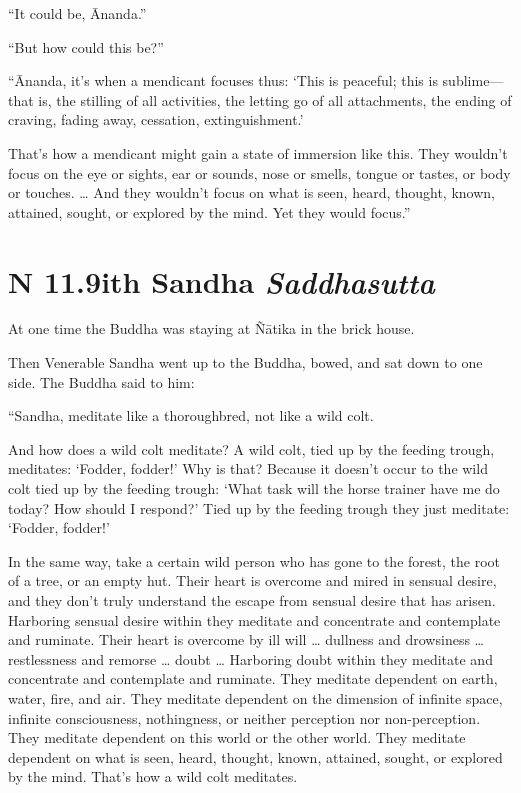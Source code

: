 \documentclass[12pt,openany]{book}%
\newcommand*{\suttatitleacronym}[1]{\smaller[2]{#1}\vspace*{.3em}}
\newcommand*{\suttatitletranslation}[1]{\linebreak{#1}}
\newcommand*{\suttatitleroot}[1]{\linebreak\smaller[2]\itshape{#1}}
\newcommand*{\tocacronym}[1]{\hspace*{-3.3em}{#1}\quad}
\newcommand*{\toctranslation}[1]{#1}
\newcommand*{\tocroot}[1]{(\textit{#1})}
\begin{document}
“It could be, Ānanda.” 

“But how could this be?” 

“Ānanda, it’s when a mendicant focuses thus: ‘This is peaceful; this is sublime—that is, the stilling of all activities, the letting go of all attachments, the ending of craving, fading away, cessation, extinguishment.’ 

That’s how a mendicant might gain a state of immersion like this. They wouldn’t focus on the eye or sights, ear or sounds, nose or smells, tongue or tastes, or body or touches. … And they wouldn’t focus on what is seen, heard, thought, known, attained, sought, or explored by the mind. Yet they would focus.” 

%
\section*{{\suttatitleacronym AN 11.9}{\suttatitletranslation With Sandha }{\suttatitleroot Saddhasutta}}
\addcontentsline{toc}{section}{\tocacronym{AN 11.9} \toctranslation{With Sandha } \tocroot{Saddhasutta}}

At one time the Buddha was staying at \textsanskrit{Ñātika} in the brick house. 

Then Venerable Sandha went up to the Buddha, bowed, and sat down to one side. The Buddha said to him: 

“Sandha, meditate like a thoroughbred, not like a wild colt. 

And how does a wild colt meditate? A wild colt, tied up by the feeding trough, meditates: ‘Fodder, fodder!’ Why is that? Because it doesn’t occur to the wild colt tied up by the feeding trough: ‘What task will the horse trainer have me do today? How should I respond?’ Tied up by the feeding trough they just meditate: ‘Fodder, fodder!’ 

In the same way, take a certain wild person who has gone to the forest, the root of a tree, or an empty hut. Their heart is overcome and mired in sensual desire, and they don’t truly understand the escape from sensual desire that has arisen. Harboring sensual desire within they meditate and concentrate and contemplate and ruminate. Their heart is overcome by ill will … dullness and drowsiness … restlessness and remorse … doubt … Harboring doubt within they meditate and concentrate and contemplate and ruminate. They meditate dependent on earth, water, fire, and air. They meditate dependent on the dimension of infinite space, infinite consciousness, nothingness, or neither perception nor non-perception. They meditate dependent on this world or the other world. They meditate dependent on what is seen, heard, thought, known, attained, sought, or explored by the mind. That’s how a wild colt meditates. 
\end{document}

